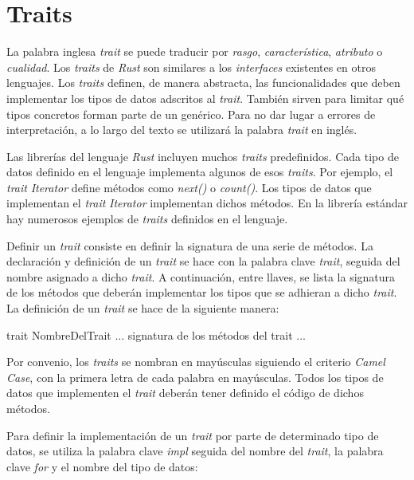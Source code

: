 \section{Traits}
\label{sec_traits}
\noindent La palabra inglesa \textit{trait} se puede traducir por \textit{rasgo}, \textit{característica}, \textit{atributo} o \textit{cualidad}. Los \textit{traits} de \textit{Rust} son similares a los \textit{interfaces} existentes en otros lenguajes. Los \textit{traits} definen, de manera abstracta, las funcionalidades que deben implementar los tipos de datos adscritos al \textit{trait}. También sirven para limitar qué tipos concretos forman parte de un genérico. Para no dar lugar a errores de interpretación, a lo largo del
texto se utilizará la palabra \textit{trait} en inglés.

Las librerías del lenguaje \textit{Rust} incluyen muchos \textit{traits} predefinidos. Cada tipo de datos definido en el lenguaje implementa algunos de esos \textit{traits}. Por ejemplo, el \textit{trait} \textit{Iterator} define métodos como \textit{next()} o \textit{count()}. Los tipos de datos que implementan el \textit{trait} \textit{Iterator} implementan dichos métodos. En la librería estándar hay numerosos ejemplos de \textit{traits} definidos en el lenguaje.

Definir un \textit{trait} consiste en definir la signatura de una serie de métodos. La declaración y definición de un \textit{trait} se hace con la palabra clave \textit{trait}, seguida del nombre asignado a dicho \textit{trait}. A continuación, entre llaves, se lista la signatura de los métodos que deberán implementar los tipos que se adhieran a dicho \textit{trait}. La definición de un \textit{trait} se hace de la siguiente manera:

\begin{Codigo}
trait NombreDelTrait {
   ... signatura de los métodos del trait ...
}
\end{Codigo}

Por convenio, los \textit{traits} se nombran en mayúsculas siguiendo el criterio \textit{Camel Case}, con la primera letra de cada palabra en mayúsculas. Todos los tipos de datos que implementen el \textit{trait} deberán tener definido el código de dichos métodos.

Para definir la implementación de un \textit{trait} por parte de determinado tipo de datos, se utiliza la palabra clave \textit{impl} seguida del nombre del \textit{trait}, la palabra clave \textit{for} y el nombre del tipo de datos:


